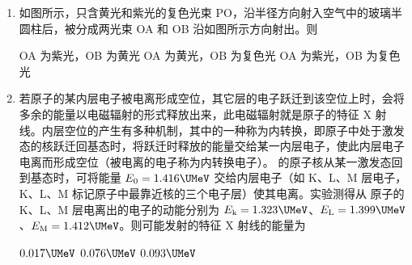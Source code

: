 \documentclass[\gkver]{gaokaozhenti}
\begin{document}
\begin{enumerate}

\item
如图所示，只含黄光和紫光的复色光束 PO，沿半径方向射入空气中的玻璃半圆柱后，被分成两光束 OA 和 OB 沿如图所示方向射出。则


{OA 为紫光，OB 为黄光}
{OA 为黄光，OB 为复色光}
{OA 为紫光，OB 为复色光}


\item
若原子的某内层电子被电离形成空位，其它层的电子跃迁到该空位上时，会将多余的能量以电磁辐射的形式释放出来，此电磁辐射就是原子的特征 X 射线。内层空位的产生有多种机制，其中的一种称为内转换，即原子中处于激发态的核跃迁回基态时，将跃迁时释放的能量交给某一内层电子，使此内层电子电离而形成空位（被电离的电子称为内转换电子）。 的原子核从某一激发态回到基态时，可将能量 $E_{0}=1.416\UMeV$ 交给内层电子（如 K、L、M 层电子，K、L、M 标记原子中最靠近核的三个电子层）使其电离。实验测得从  原子的 K、L、M 层电离出的电子的动能分别为 $E_{\text{k}}=1.323\UMeV$、$E_{\text{L}}=1.399\UMeV$、$E_{\text{M}}=1.412\UMeV$。则可能发射的特征 X 射线的能量为

\fourchoices[answer=AC]
{$0.013\UMeV$}
{$0.017\UMeV$}
{$0.076\UMeV$}
{$0.093\UMeV$}

\end{enumerate}
\end{document}
